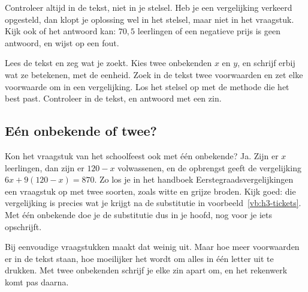 Controleer altijd in de tekst, niet in je stelsel. Heb je een vergelijking verkeerd opgesteld, dan klopt je oplossing wel in het stelsel, maar niet in het vraagstuk. Kijk ook of het antwoord kan: $70{,}5$ leerlingen of een negatieve prijs is geen antwoord, en wijst op een fout.

\begin{werkwijze}
Lees de tekst en zeg wat je zoekt. Kies twee onbekenden $x$ en $y$, en schrijf erbij wat ze betekenen, met de eenheid. Zoek in de tekst twee voorwaarden en zet elke voorwaarde om in een vergelijking. Los het stelsel op met de methode die het best past. Controleer in de tekst, en antwoord met een zin.
\end{werkwijze}


\begin{oefeningen}
\end{oefeningen}

\subsection{Eén onbekende of twee?}

Kon het vraagstuk van het schoolfeest ook met één onbekende? Ja. Zijn er $x$ leerlingen, dan zijn er $120 - x$ volwassenen, en de opbrengst geeft de vergelijking $6x + 9(120 - x) = 870$. Zo los je in het handboek Eerstegraadsvergelijkingen een vraagstuk op met twee soorten, zoals witte en grijze broden. Kijk goed: die vergelijking is precies wat je krijgt na de substitutie in voorbeeld~\ref{vb:h3-tickets}. Met één onbekende doe je de substitutie dus in je hoofd, nog voor je iets opschrijft.

Bij eenvoudige vraagstukken maakt dat weinig uit. Maar hoe meer voorwaarden er in de tekst staan, hoe moeilijker het wordt om alles in één letter uit te drukken. Met twee onbekenden schrijf je elke zin apart om, en het rekenwerk komt pas daarna.

